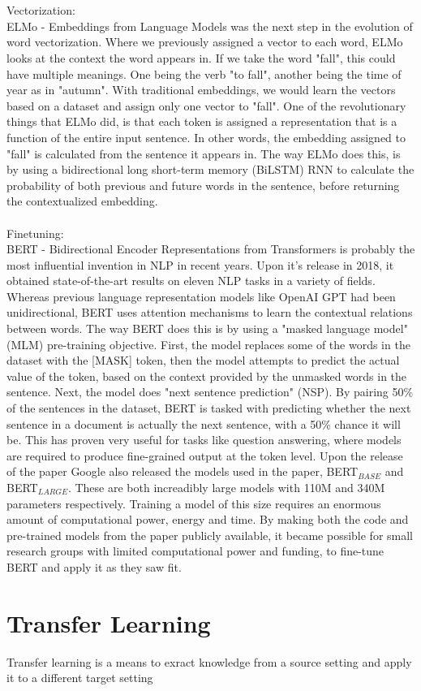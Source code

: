 \documentclass{report}
\begin{document}
\\\\
\noindent
Vectorization:\\
ELMo - Embeddings from Language Models was the next step in the evolution of word vectorization. Where we previously assigned a vector to each word, ELMo looks at the context the word appears in. If we take the word "fall", this could have multiple meanings. One being the verb "to fall", another being the time of year as in "autumn". With traditional embeddings, we would learn the vectors based on a dataset and assign only one vector to "fall". One of the revolutionary things that ELMo did, is that each token is assigned a representation that is a function of the entire input sentence. In other words, the embedding assigned to "fall" is calculated from the sentence it appears in. The way ELMo does this, is by using a bidirectional long short-term memory (BiLSTM) RNN to calculate the probability of both previous and future words in the sentence, before returning the contextualized embedding.
\\\\
Finetuning:\\
BERT - Bidirectional Encoder Representations from Transformers is probably the most influential invention in NLP in recent years. Upon it's release in 2018, it obtained state-of-the-art results on eleven NLP tasks in a variety of fields. Whereas previous language representation models like OpenAI GPT had been unidirectional, BERT uses attention mechanisms to learn the contextual relations between words. The way BERT does this is by using a "masked language model" (MLM) pre-training objective. First, the model replaces some of the words in the dataset with the [MASK] token, then the model attempts to predict the actual value of the token, based on the context provided by the unmasked words in the sentence. Next, the model does "next sentence prediction" (NSP). By pairing 50\% of the sentences in the dataset, BERT is tasked with predicting whether the next sentence in a document is actually the next sentence, with a 50\% chance it will be. This has proven very useful for tasks like question answering, where models are required to produce fine-grained output at the token level. Upon the release of the paper Google also released the models used in the paper, BERT$_{BASE}$ and BERT$_{LARGE}$. These are both increadibly large models with 110M and 340M parameters respectively. Training a model of this size requires an enormous amount of computational power, energy and time. By making both the code and pre-trained models from the paper publicly available, it became possible for small research groups with limited computational power and funding, to fine-tune BERT and apply it as they saw fit.
\section{Transfer Learning}
Transfer learning is a means to exract knowledge from a source setting and apply it to a different target setting

\newpage


\end{document}
